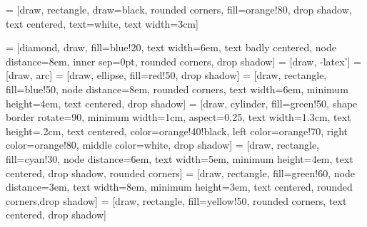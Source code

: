 \usepackage{tikz} 
\usetikzlibrary{shapes,arrows}

 = [draw, rectangle, draw=black, rounded corners, fill=orange!80, drop shadow,
                        text centered, text=white, text width=3cm]
                        
 = [diamond, draw, fill=blue!20, text width=6em, text badly centered, node distance=8em, inner sep=0pt, rounded corners, drop shadow]
     = [draw, -latex']
      = [draw, arc]
     = [draw, ellipse, fill=red!50, drop shadow] 
     = [draw, rectangle, fill=blue!50, node distance=8em, rounded corners, text width=6em, minimum height=4em, text centered, drop shadow]
      = [draw, cylinder, fill=green!50, shape border rotate=90, minimum width=1cm, aspect=0.25, text width=1.3cm, text height=.2cm, text centered, 
                         color=orange!40!black, left color=orange!70, right color=orange!80, middle color=white, drop shadow]
     = [draw, rectangle, fill=cyan!30, node distance=6em, text width=5em, minimum height=4em, text centered, drop shadow, rounded corners]
      = [draw, rectangle, fill=green!60, node distance=3em, text width=8em, minimum height=3em, text centered, rounded corners,drop shadow]
  = [draw, rectangle, fill=yellow!50, rounded corners, text centered, drop shadow]


